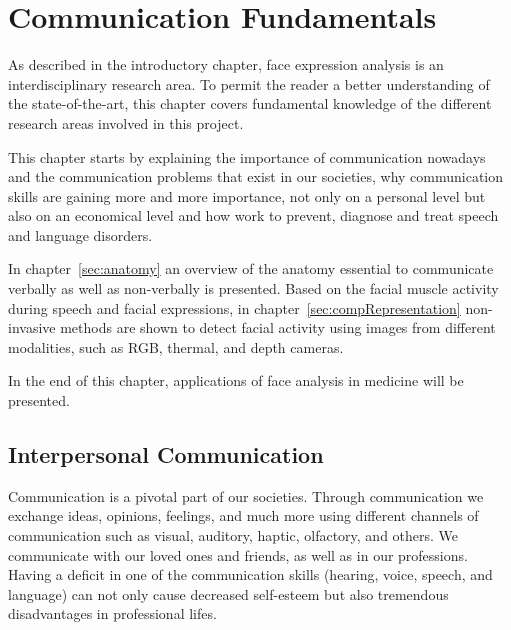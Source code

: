 \chapter{Communication Fundamentals}
\label{cha:fundamentals}
\acresetall


As described in the introductory chapter, face expression analysis is an interdisciplinary research area. To permit the reader a better understanding of the state-of-the-art, this chapter covers fundamental knowledge of the different research areas involved in this project. 

This chapter starts by explaining the importance of communication nowadays and the communication problems that exist in our societies, why communication skills are gaining more and more importance, not only on a personal level but also on an economical level and how  work to prevent, diagnose and treat speech and language disorders.

In chapter~\ref{sec:anatomy} an overview of the anatomy essential to communicate verbally as well as non-verbally is presented. Based on the facial muscle activity during speech and facial expressions, in chapter~\ref{sec:compRepresentation} non-invasive methods are shown to detect facial activity using images from different modalities, such as RGB, thermal, and depth cameras.

In the end of this chapter, applications of face analysis in medicine will be presented. 


\section{Interpersonal Communication} %
\label{sec:communication}

Communication is a pivotal part of our societies. Through communication we exchange ideas, opinions, feelings, and much more using different channels of communication such as visual, auditory, haptic, olfactory, and others. We communicate with our loved ones and friends, as well as in our professions. Having a deficit in one of the communication skills (hearing, voice, speech, and language) can not only cause decreased self-esteem but also tremendous disadvantages in professional lifes. 

